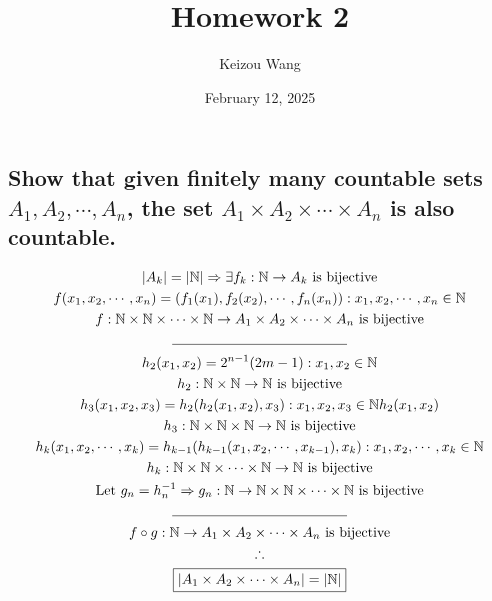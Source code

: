 \documentclass[letterpaper]{article}
\title{Homework 2}
\author{Keizou Wang}
\date{February 12, 2025}
\begin{document}
\maketitle

\section{}
\subsection{Show that given finitely many countable sets $A_1,A_2,\dotsb,A_n$, the set $A_1\times A_2\times\dotsb\times A_n$ is also countable.}
\begin{gather*}
|A_k|=|\mathbb{N}|\Rightarrow\exists f_k:\mathbb{N}\rightarrow A_k \text{ is bijective} \\
f(x_1,x_2,\dotsb,x_n)=(f_1(x_1),f_2(x_2),\dotsb,f_n(x_n)): x_1,x_2,\dotsb,x_n\in\mathbb{N} \\
f:\mathbb{N}\times\mathbb{N}\times\dotsb\times\mathbb{N}\rightarrow A_1\times A_2\times\dotsb\times A_n\text{ is bijective} \\
\line(1, 0){125} \\
h_2(x_1, x_2)=2^{n-1}(2m-1): x_1,x_2\in\mathbb{N} \\
h_2: \mathbb{N}\times\mathbb{N}\rightarrow\mathbb{N}\text{ is bijective} \\
h_3(x_1,x_2,x_3)=h_2(h_2(x_1,x_2),x_3):x_1,x_2,x_3\in\mathbb{N}
h_2(x_1,x_2) \\
h_3: \mathbb{N}\times\mathbb{N}\times\mathbb{N}\rightarrow\mathbb{N}\text{ is bijective} \\
h_k(x_1,x_2,\dotsb,x_k)=h_{k-1}(h_{k-1}(x_1,x_2,\dotsb,x_{k-1}),x_k):x_1,x_2,\dotsb,x_k\in\mathbb{N} \\
h_k:\mathbb{N}\times\mathbb{N}\times\dotsb\times\mathbb{N}\rightarrow\mathbb{N}\text{ is bijective} \\
\text{Let }g_n=h_n^{-1}\Rightarrow g_n:\mathbb{N}\rightarrow\mathbb{N}\times\mathbb{N}\times\dotsb\times\mathbb{N}\text{ is bijective} \\
\line(1, 0){125} \\
f\circ g: \mathbb{N}\rightarrow A_1\times A_2\times\dotsb\times A_n\text{ is bijective} \\
\therefore \\
\boxed{|A_1\times A_2\times\dotsb\times A_n|=|\mathbb{N}|}
\end{gather*}
\end{document}
